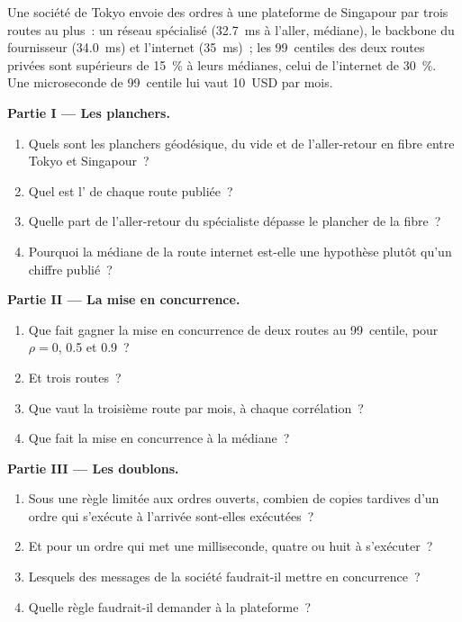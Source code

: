 \begin{problem}\label{pb:nw:cross-region-crypto-networks:1}
Une société de Tokyo envoie des ordres à une plateforme de Singapour par trois routes au plus~: un réseau spécialisé (\qty{32.7}{\milli\second} à l'aller, médiane), le
backbone du fournisseur (\qty{34.0}{\milli\second}) et l'internet (\qty{35}{\milli\second})~; les 99~centiles des deux routes privées sont supérieurs de 15~\%
à leurs médianes, celui de l'internet de 30~\%. Une microseconde de 99~centile lui vaut 10~USD par mois.

\medskip\noindent\textbf{Partie I --- Les planchers.}
\begin{enumerate}
\item Quels sont les planchers géodésique, du vide et de l'aller-retour en fibre entre Tokyo et Singapour~?
\item Quel est l' de chaque route publiée~?
\item Quelle part de l'aller-retour du spécialiste dépasse le plancher de la fibre~?
\item Pourquoi la médiane de la route internet est-elle une hypothèse plutôt qu'un chiffre publié~?
\end{enumerate}

\medskip\noindent\textbf{Partie II --- La mise en concurrence.}
\begin{enumerate}[resume]
\item Que fait gagner la mise en concurrence de deux routes au 99~centile, pour $\rho = 0$, 0.5 et 0.9~?
\item Et trois routes~?
\item Que vaut la troisième route par mois, à chaque corrélation~?
\item Que fait la mise en concurrence à la médiane~?
\end{enumerate}

\medskip\noindent\textbf{Partie III --- Les doublons.}
\begin{enumerate}[resume]
\item Sous une règle limitée aux ordres ouverts, combien de copies tardives d'un ordre qui s'exécute à l'arrivée sont-elles exécutées~?
\item Et pour un ordre qui met une milliseconde, quatre ou huit à s'exécuter~?
\item Lesquels des messages de la société faudrait-il mettre en concurrence~?
\item Quelle règle faudrait-il demander à la plateforme~?
\end{enumerate}


\end{problem}
